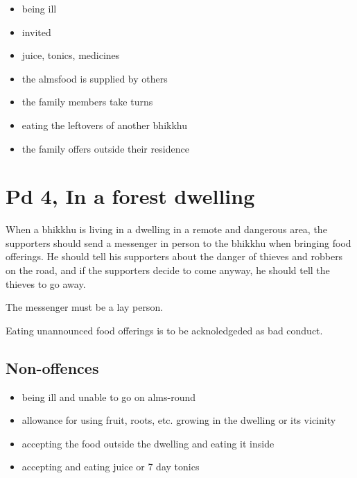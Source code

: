 \begin{multicols}{2}

\begin{itemize}
\tightlist
\item
  being ill
\item
  invited
\item
  juice, tonics, medicines
\item
  the almsfood is supplied by others
\item
  the family members take turns
\item
  eating the leftovers of another bhikkhu
\item
  the family offers outside their residence
\end{itemize}

\end{multicols}

\section{Pd 4, In a forest dwelling}

When a bhikkhu is living in a dwelling in a remote and dangerous area,
the supporters should send a messenger in person to the bhikkhu when
bringing food offerings. He should tell his supporters about the danger
of thieves and robbers on the road, and if the supporters decide to come
anyway, he should tell the thieves to go away.

The messenger must be a lay person.

Eating unannounced food offerings is to be acknoledgeded as bad conduct.

\subsection{Non-offences}

\begin{itemize}
\tightlist
\item
  being ill and unable to go on alms-round
\item
  allowance for using fruit, roots, etc. growing in the dwelling or its
  vicinity
\item
  accepting the food outside the dwelling and eating it inside
\item
  accepting and eating juice or 7 day tonics
\end{itemize}


